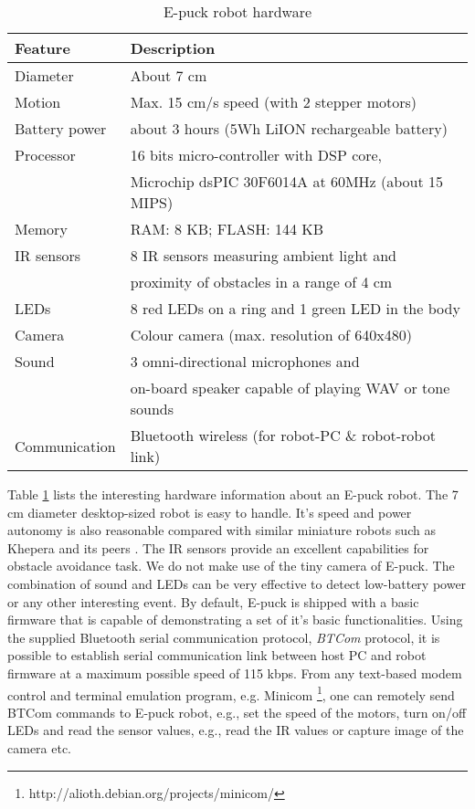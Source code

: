 \begin{table}
\caption{E-puck robot hardware}
\label{table:epuck}
\begin{center}
\begin{tabular}{|l|l|}
\hline \textbf{Feature} & \textbf{Description}\\
\hline Diameter & About 7 cm\\
\hline Motion & Max. 15 cm/s speed (with 2 stepper motors)\\
\hline Battery power & about 3 hours (5Wh LiION rechargeable battery)\\
\hline Processor & 16 bits micro-controller with DSP core,\\ & Microchip dsPIC 30F6014A at 60MHz (about 15 MIPS)\\
\hline Memory & RAM: 8 KB; FLASH: 144 KB \\
\hline IR sensors & 8 IR sensors measuring ambient light and \\ & proximity of obstacles in a range of 4 cm\\
\hline LEDs & 8 red LEDs on a ring and 1 green LED in the body \\
\hline Camera & Colour camera (max. resolution of 640x480) \\
\hline Sound & 3 omni-directional microphones and\\ & on-board speaker capable of playing WAV or tone sounds\\
\hline Communication & Bluetooth wireless (for robot-PC \& robot-robot link)\\
\hline
\end{tabular}
\end{center}
\end{table}
Table \ref{table:epuck} lists the interesting hardware information about an E-puck robot. The 7 cm diameter desktop-sized robot is easy to handle. It's speed and power autonomy is also reasonable compared with similar miniature robots such as Khepera and its peers \cite{Mondada+2009}. The IR sensors provide an excellent capabilities for obstacle avoidance task. We do not make use of the tiny camera of E-puck. The combination of sound and LEDs can be very effective to detect low-battery power or any other interesting event. By default, E-puck is shipped with a basic firmware that is capable of demonstrating a set of it's basic functionalities. Using the supplied Bluetooth serial communication protocol,  {\em BTCom} protocol, it is possible to establish serial communication link between host PC and robot firmware at a maximum possible speed of 115 kbps. From any  text-based modem control and terminal emulation program, e.g. Minicom \footnote{http://alioth.debian.org/projects/minicom/}, one can remotely send BTCom commands to E-puck robot, e.g., set the speed of the motors, turn on/off LEDs and read the sensor values, e.g., read the IR values or capture image of the camera etc.
